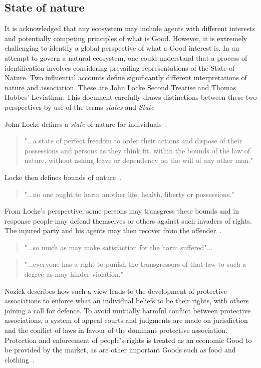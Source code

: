 \documentclass[11pt, oneside]{article}   	%
\begin{document}
\subsection{State of nature}
It is acknowledged that any ecosystem may include agents with different interests and potentially competing principles of what is Good.
However, it is extremely challenging to identify a global perspective of what a Good interest is.
In an attempt to govern a natural ecosystem, one could understand that a process of identification involves considering prevailing representations of the State of Nature.
Two influential accounts define significantly different interpretations of nature and association.
These are John Locke Second Treatise and Thomas Hobbes' Leviathan.
This document carefully draws distinctions between these two perspectives by use of the terms \emph{states} and \emph{State}\

John Locke defines a \emph{state} of nature for individuals~\cite{jl1}.

\begin{quote}
"...a state of perfect freedom to order their actions and dispose of their possessions and persons as they think fit, within the bounds of the law of nature, without asking leave or dependency on the will of any other man."
\end{quote}

Locke then defines bounds of nature~\cite{jl1}.

\begin{quote}
"...no one ought to harm another life, health, liberty or possessions."
\end{quote}

From Locke's perspective, some persons may transgress these bounds and in response people may defend themselves or others against such invaders of rights.
The injured party and his agents may then recover from the offender~\cite{jl1}.

\begin{quote}
"...so much as may make satisfaction for the harm suffered"...
\end{quote}
\begin{quote}
"...everyone has a right to punish the transgressors of that law to such a degree as may hinder violation."
\end{quote}

Nozick describes how such a view leads to the development of protective associations to enforce what an individual beliefs to be their rights, with others joining a call for defence.
To avoid mutually harmful conflict between protective associations, a system of appeal courts and judgments are made on jurisdiction and the conflict of laws in favour of the dominant protective association.
Protection and enforcement of people's rights is treated as an economic Good to be provided by the market, as are other important Goods such as food and clothing~\cite{rn1}.\
\end{document}
